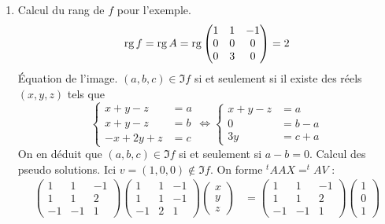 \begin{enumerate}
\item Calcul du rang de $f$ pour l'exemple.
\begin{displaymath}
 \operatorname{rg} f = \operatorname{rg} A = \operatorname{rg} 
\begin{pmatrix}
 1 & 1 &-1 \\ 0 & 0 & 0 \\ 0 & 3 & 0 
\end{pmatrix}
= 2 
\end{displaymath}
\'Equation de l'image.\newline
$(a,b,c)\in \Im f$ si et seulement si il existe des réels $(x,y,z)$ tels que
\begin{displaymath}
 \left\lbrace 
\begin{aligned}
 x+y-z &= a \\
x+y-z &= b \\
-x+2y +z &= c
\end{aligned}
\right. 
\Leftrightarrow
 \left\lbrace 
\begin{aligned}
 x+y-z &= a \\
0 &= b-a \\
3y &= c +a
\end{aligned}
\right. 
\end{displaymath}
On en déduit que $(a,b,c)\in \Im f$ si et seulement si $a-b=0$.\newline
Calcul des pseudo solutions.\newline
Ici $v=(1,0,0) \not \in \Im f$. On forme $^tAAX = ^tAV$ :
\begin{align*}
 \begin{pmatrix}
 1 &  1 &-1  \\
 1 & 1  & 2 \\
-1 & -1 & 1
 \end{pmatrix}
 \begin{pmatrix}
 1 & 1 &-1 \\
 1 & 1 & -1 \\
-1 & 2 & 1
 \end{pmatrix}
 \begin{pmatrix}
 x \\
 y \\
 z
 \end{pmatrix}
&=
 \begin{pmatrix}
 1 &  1 &-1 \\
 1 & 1  & 2 \\
-1 & -1 & 1
 \end{pmatrix}
 \begin{pmatrix}
 1  \\ 0 \\ 1

\end{pmatrix}
\end{align*}
\end{enumerate}
